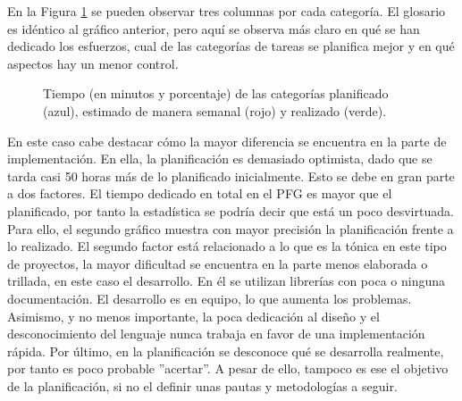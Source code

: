 En la Figura \ref{fig:TiemposPorCategoria} se pueden observar tres columnas por cada categoría. El glosario es idéntico al gráfico anterior, pero aquí se observa más claro en qué se han dedicado los esfuerzos, cual de las categorías de tareas se planifica mejor y en qué aspectos hay un menor control.

\begin{figure}
\begin{center}
\end{center}
\caption{Tiempo (en minutos y porcentaje) de las categorías planificado (azul), estimado de manera semanal (rojo) y realizado (verde).}
\label{fig:TiemposPorCategoria}
\end{figure}

En este caso cabe destacar cómo la mayor diferencia se encuentra en la parte de implementación. En ella, la planificación es demasiado optimista, dado que se tarda casi 50 horas más de lo planificado inicialmente. 
Esto se debe en gran parte a dos factores. El tiempo dedicado en total en el PFG es mayor que el planificado, por tanto la estadística se podría decir que está un poco desvirtuada. Para ello, el segundo gráfico muestra con mayor precisión la planificación frente a lo realizado. El segundo factor está relacionado a lo que es la tónica en este tipo de proyectos, la mayor dificultad se encuentra en la parte menos elaborada o trillada, en este caso el desarrollo. En él se utilizan librerías con poca o ninguna documentación. El desarrollo es en equipo, lo que aumenta los problemas. Asimismo, y no menos importante, la poca dedicación al diseño y el desconocimiento del lenguaje nunca trabaja en favor de una implementación rápida. Por último, en la planificación se desconoce qué se desarrolla realmente, por tanto es poco probable ''acertar''. A pesar de ello, tampoco es ese el objetivo de la planificación, si no el definir unas pautas y metodologías a seguir.

